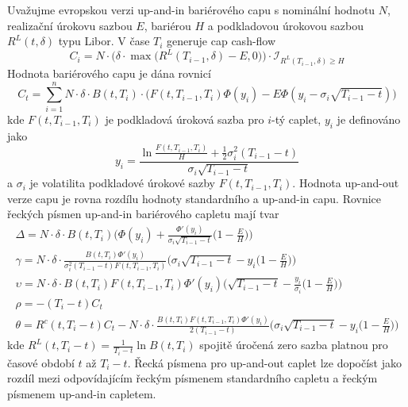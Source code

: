 \documentclass[a4paper]{book}
\begin{document}
Uvažujme evropskou verzi up-and-in bariérového capu s nominální hodnotu $N$, realizační úrokovu sazbou $E$, bariérou $H$ a podkladovou úrokovou sazbou $R^L(t, \delta)$ typu Libor. V čase $T_i$ generuje cap cash-flow
\begin{equation*}
C_i = N \cdot \big( \delta \cdot \max \big( R^L(T_{i-1}, \delta) - E, 0 \big) \big) \cdot \mathcal{I}_{R^L(T_{i-1}, \delta) \ge H}
\end{equation*}
Hodnota bariérového capu je dána rovnicí
\begin{equation*}
C_t = \sum_{i=1}^n N \cdot \delta \cdot B(t, T_i) \cdot \big( F(t, T_{i-1}, T_i)\Phi(y_i) - E\Phi(y_i - \sigma_i\sqrt{T_{i-1} -t })\big)
\end{equation*}
kde $F(t, T_{i-1}, T_i)$ je podkladová úroková sazba pro $i$-tý caplet, $y_i$ je definováno jako
\begin{equation*}
y_i = \frac{\ln \frac{F(t, T_{i-1}, T_i)}{H} + \frac{1}{2}\sigma_i^2(T_{i-1} - t)}{\sigma_i \sqrt{T_{i-1} - t}}
\end{equation*}
a $\sigma_i$ je volatilita podkladové úrokové sazby $F(t, T_{i-1}, T_i)$. Hodnota up-and-out verze capu je rovna rozdílu hodnoty standardního a up-and-in capu. Rovnice řeckých písmen up-and-in bariérového capletu mají tvar
\begin{gather*}
\Delta = N \cdot \delta \cdot B(t, T_i) \Bigg( \Phi(y_i) + \frac{\Phi'(y_i)}{\sigma_i \sqrt{T_{i-1} - t}} \Big(1 - \frac{E}{H} \Big) \Bigg)\\
\gamma = N \cdot \delta \cdot \frac{B(t, T_i)\Phi'(y_i)}{\sigma_i^2(T_{i-1} - t)F(t, T_{i-1}, T_i)}\Bigg( \sigma_i \sqrt{T_{i-1} - t} - y_i \Big( 1 - \frac{E}{H} \Big) \Bigg)\\
\upsilon = N \cdot \delta \cdot B(t, T_i)F(t, T_{i-1}, T_i) \Phi'(y_i) \Bigg( \sqrt{T_{i-1} - t} - \frac{y_i}{\sigma_i}\Big( 1 - \frac{E}{H} \Big) \Bigg)\\
\rho = -(T_i - t)C_t\\
\theta = R^c(t, T_i - t) C_t - N \cdot \delta \cdot \frac{B(t, T_i)F(t, T_{i-1}, T_i)\Phi'(y_i)}{2(T_{i-1} - t)}\Bigg( \sigma_i \sqrt{T_{i-1} - t} - y_i \Big( 1 - \frac{E}{H} \Big) \Bigg)
\end{gather*}
kde $R^L(t, T_i - t) = \frac{1}{T_i - t} \ln B(t, T_i)$ spojitě úročená zero sazba platnou pro časové období $t$ až $T_i - t$. Řecká písmena pro up-and-out caplet lze dopočíst jako rozdíl mezi odpovídajícím řeckým písmenem standardního capletu a řeckým písmenem up-and-in capletem.
\end{document}
